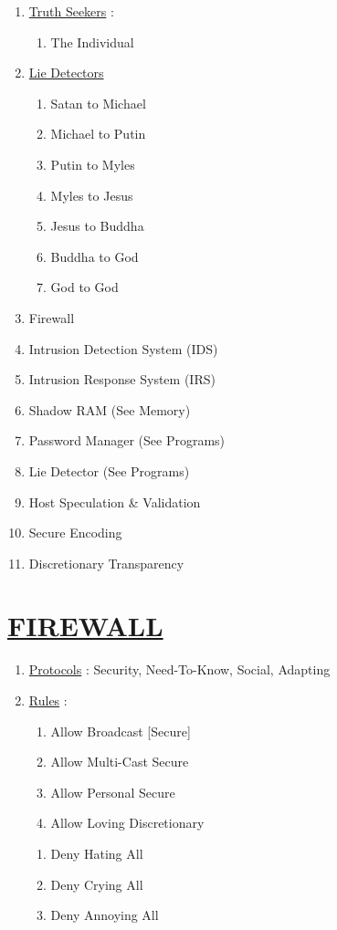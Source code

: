 \documentclass[11pt]{article}
\begin{document}
\begin{enumerate}
	\item[] \ul{Truth Seekers} :
	\begin{enumerate}
		\item[] The Individual
	\end{enumerate}

	\item[] \ul{Lie Detectors}
	\begin{enumerate}
		\item[] Satan to Michael
		\item[] Michael to Putin
		\item[] Putin to Myles
		\item[] Myles to Jesus
		\item[] Jesus to Buddha
		\item[] Buddha to God
		\item[] God to God
	\end{enumerate}

	\item[] Firewall
	\item[] Intrusion Detection System (IDS)
	\item[] Intrusion Response System (IRS)
	\item[] Shadow RAM (See Memory)
	\item[] Password Manager (See Programs)
	\item[] Lie Detector (See Programs)
	\item[] Host Speculation \& Validation
	\item[] Secure Encoding
	\item[] Discretionary Transparency
	
\end{enumerate}


\section*{\ul{FIREWALL}}
\begin{enumerate}
	\item[] \ul{Protocols} : Security, Need-To-Know, Social, Adapting

	\item[] \ul{Rules} :
	\begin{enumerate}
		\item[] Allow Broadcast [Secure]
		\item[] Allow Multi-Cast Secure
		\item[] Allow Personal Secure
		\item[] Allow Loving Discretionary
	\end{enumerate}

	\begin{enumerate}
		\item[] Deny Hating All
		\item[] Deny Crying All
		\item[] Deny Annoying All
	\end{enumerate}

\end{enumerate}
\end{document}
